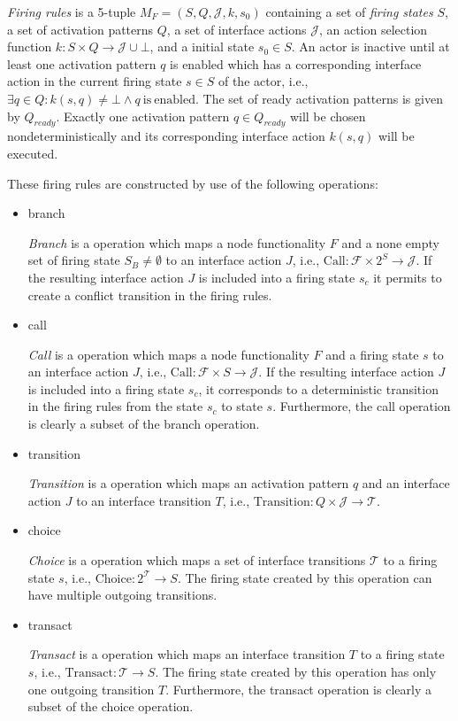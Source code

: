 \begin{definition}\label{firing-rules}
\emph{Firing rules} is a 5-tuple $M_{F} = (S, Q, \mathcal{J}, k, s_0)$ containing
a set of \emph{firing states} $S$, a set of activation patterns $Q$,
a set of interface actions $\mathcal{J}$, an action selection function
$k: S \times Q \to \mathcal{J} \cup \bot$,
and a initial state $s_0 \in S$. An actor is inactive until at least
one activation pattern $q$ is enabled which has a corresponding
interface action in the current firing state $s \in S$ of the actor,
i.e., $\exists{q \in Q}: k(s,q) \ne \bot \wedge q\ \mathrm{is\ enabled}$.
The set of ready activation patterns is given by $Q_{ready}$.
Exactly one activation pattern $q \in Q_{ready}$ will be
chosen nondeterministically and its corresponding interface action
$k(s,q)$ will be executed.
\end{definition}

These firing rules are constructed by use of the following operations:

\begin{itemize}
\item branch

\emph{Branch} is a operation which maps a node functionality $F$ and
a none empty set of firing state $S_{B} \ne \emptyset$ to an interface action $J$,
i.e., $\mathrm{Call}: \mathcal{F} \times 2^S \to \mathcal{J}$.
If the resulting interface action $J$ is included into a
firing state $s_{c}$ it permits to create a conflict transition
in the firing rules.
\item call

\emph{Call} is a operation which maps a node functionality $F$ and
a firing state $s$ to an interface action $J$,
i.e., $\mathrm{Call}: \mathcal{F} \times S \to \mathcal{J}$.
If the resulting interface action $J$ is included into a
firing state $s_{c}$, it corresponds to a deterministic transition
in the firing rules from the state $s_{c}$ to state $s$.
Furthermore, the call operation is clearly a subset of the
branch operation.

\item transition

\emph{Transition} is a operation which maps an activation pattern $q$ and
an interface action $J$ to an interface transition $T$,
i.e., $\mathrm{Transition}: Q \times \mathcal{J} \to \mathcal{T}$.

\item choice

\emph{Choice} is a operation which maps a set of interface transitions $\mathcal{T}$
to a firing state $s$,
i.e., $\mathrm{Choice}: 2^{\mathcal{T}} \to S$.
The firing state created by this operation can have multiple outgoing
transitions.

\item transact

\emph{Transact} is a operation which maps an interface transition $T$
to a firing state $s$,
i.e., $\mathrm{Transact}: \mathcal{T} \to S$.
The firing state created by this operation has only one outgoing
transition $T$. Furthermore, the transact operation is clearly a subset of the
choice operation.
\end{itemize}

